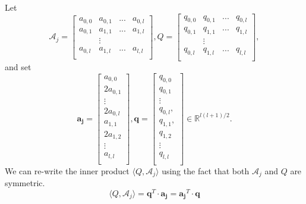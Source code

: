 \documentclass[12pt]{amsart}
\numberwithin{equation}{section}
\theoremstyle{definition}
\numberwithin{thm}{section}
\begin{document}
\smallskip
Let 
\begin{equation*}
     \mathcal{A}_j = \begin{bmatrix}
          a_{0, 0} & a_{0, 1} & ... &a_{0, l}\\
          a_{0, 1} & a_{1, 1} & ... &a_{1, l} \\
          & \vdots \\
          a_{0, l} & a_{1, l} &... &a_{l, l}\\
\end{bmatrix}, 
     Q = \begin{bmatrix}
          q_{0, 0} & q_{0, 1} & ... &q_{0, l}\\
          q_{0, 1} & q_{1, 1} & ... &q_{1, l} \\
          & \vdots \\
          q_{0, l} & q_{1, l} &... &q_{l, l}\\
     \end{bmatrix},
\end{equation*}
and set
\begin{equation*}
     \mathbf{a_j} = \begin{bmatrix}
          a_{0, 0}\\
          2a_{0, 1} \\
          \vdots \\
          2a_{0, l} \\ a_{1, 1} \\ 2a_{1, 2} \\
          \vdots \\
          a_{l, l}\\
     \end{bmatrix},   
     \mathbf{q} = \begin{bmatrix}
          q_{0, 0}\\
          q_{0, 1} \\
          \vdots \\
          q_{0,l}, \\q_{1,1}, \\q_{1,2}\\
          \vdots \\
          q_{l, l}\\
     \end{bmatrix}\in \mathbb{R}^{l(l+1)/2}.
\end{equation*}
We can re-write the inner product $\langle Q, \mathcal{A}_j \rangle$ using the fact that both $\mathcal{A}_j$ and $Q$ are symmetric. \begin{equation*}
     \langle Q, \mathcal{A}_j \rangle = \mathbf{q}^T \cdot \mathbf{a_j} = \mathbf{a_j}^T \cdot \mathbf{q}
\end{equation*}
\end{document}
